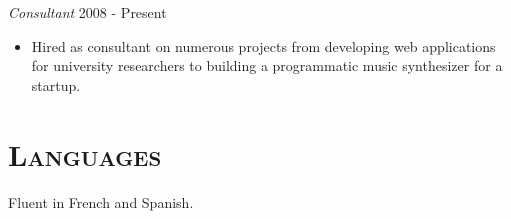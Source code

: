 \documentclass[margin]{res}
\begin{document}
\begin{resume}
    {\sl Consultant} \hfill 2008 - Present
    \begin{itemize}  \itemsep -2pt %
        \item Hired as consultant on numerous projects from developing web applications for university researchers to building a programmatic music synthesizer for a startup.
    \end{itemize}

\section{\textsc{Languages}} Fluent in French and Spanish.

\end{resume}
\end{document}
